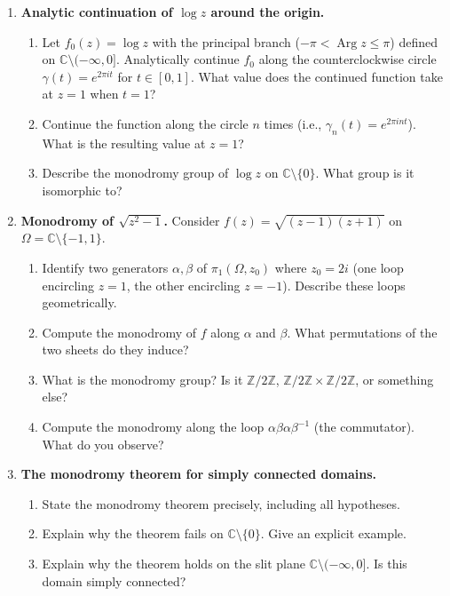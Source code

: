 \begin{enumerate}

    \item \textbf{Analytic continuation of $\log z$ around the origin.}
    \begin{enumerate}
        \item Let $f_0(z) = \log z$ with the principal branch ($-\pi < \operatorname{Arg} z \leq \pi$) defined on $\mathbb{C} \setminus (-\infty, 0]$. Analytically continue $f_0$ along the counterclockwise circle $\gamma(t) = e^{2\pi i t}$ for $t \in [0, 1]$. What value does the continued function take at $z = 1$ when $t = 1$?
        \item Continue the function along the circle $n$ times (i.e., $\gamma_n(t) = e^{2\pi i n t}$). What is the resulting value at $z = 1$?
        \item Describe the monodromy group of $\log z$ on $\mathbb{C} \setminus \{0\}$. What group is it isomorphic to?
    \end{enumerate}

    \item \textbf{Monodromy of $\sqrt{z^2 - 1}$.}
    Consider $f(z) = \sqrt{(z-1)(z+1)}$ on $\Omega = \mathbb{C} \setminus \{-1, 1\}$.
    \begin{enumerate}
        \item Identify two generators $\alpha, \beta$ of $\pi_1(\Omega, z_0)$ where $z_0 = 2i$ (one loop encircling $z = 1$, the other encircling $z = -1$). Describe these loops geometrically.
        \item Compute the monodromy of $f$ along $\alpha$ and $\beta$. What permutations of the two sheets do they induce?
        \item What is the monodromy group? Is it $\mathbb{Z}/2\mathbb{Z}$, $\mathbb{Z}/2\mathbb{Z} \times \mathbb{Z}/2\mathbb{Z}$, or something else?
        \item Compute the monodromy along the loop $\alpha\beta\alpha\beta^{-1}$ (the commutator). What do you observe?
    \end{enumerate}

    \item \textbf{The monodromy theorem for simply connected domains.}
    \begin{enumerate}
        \item State the monodromy theorem precisely, including all hypotheses.
        \item Explain why the theorem fails on $\mathbb{C} \setminus \{0\}$. Give an explicit example.
        \item Explain why the theorem holds on the slit plane $\mathbb{C} \setminus (-\infty, 0]$. Is this domain simply connected?
    \end{enumerate}


\end{enumerate}

